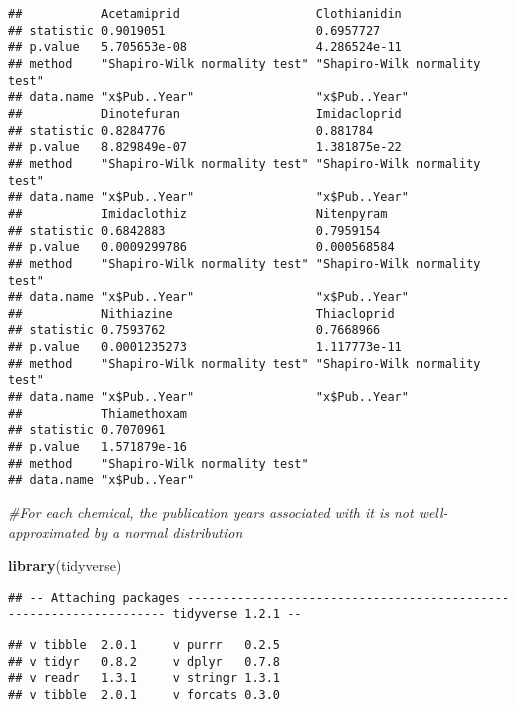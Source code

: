 \documentclass[]{article}
\newenvironment{Shaded}{\begin{snugshade}}{\end{snugshade}}
\newcommand{\KeywordTok}[1]{\textcolor[rgb]{0.13,0.29,0.53}{\textbf{#1}}}
\newcommand{\CommentTok}[1]{\textcolor[rgb]{0.56,0.35,0.01}{\textit{#1}}}
\newcommand{\NormalTok}[1]{#1}
\begin{document}
\begin{verbatim}
##           Acetamiprid                   Clothianidin                 
## statistic 0.9019051                     0.6957727                    
## p.value   5.705653e-08                  4.286524e-11                 
## method    "Shapiro-Wilk normality test" "Shapiro-Wilk normality test"
## data.name "x$Pub..Year"                 "x$Pub..Year"                
##           Dinotefuran                   Imidacloprid                 
## statistic 0.8284776                     0.881784                     
## p.value   8.829849e-07                  1.381875e-22                 
## method    "Shapiro-Wilk normality test" "Shapiro-Wilk normality test"
## data.name "x$Pub..Year"                 "x$Pub..Year"                
##           Imidaclothiz                  Nitenpyram                   
## statistic 0.6842883                     0.7959154                    
## p.value   0.0009299786                  0.000568584                  
## method    "Shapiro-Wilk normality test" "Shapiro-Wilk normality test"
## data.name "x$Pub..Year"                 "x$Pub..Year"                
##           Nithiazine                    Thiacloprid                  
## statistic 0.7593762                     0.7668966                    
## p.value   0.0001235273                  1.117773e-11                 
## method    "Shapiro-Wilk normality test" "Shapiro-Wilk normality test"
## data.name "x$Pub..Year"                 "x$Pub..Year"                
##           Thiamethoxam                 
## statistic 0.7070961                    
## p.value   1.571879e-16                 
## method    "Shapiro-Wilk normality test"
## data.name "x$Pub..Year"
\end{verbatim}

\begin{Shaded}
\begin{Highlighting}[]
\CommentTok{#For each chemical, the publication years associated with it is not well-approximated by a normal distribution}

\KeywordTok{library}\NormalTok{(tidyverse)}
\end{Highlighting}
\end{Shaded}

\begin{verbatim}
## -- Attaching packages ------------------------------------------------------------------- tidyverse 1.2.1 --
\end{verbatim}

\begin{verbatim}
## v tibble  2.0.1     v purrr   0.2.5
## v tidyr   0.8.2     v dplyr   0.7.8
## v readr   1.3.1     v stringr 1.3.1
## v tibble  2.0.1     v forcats 0.3.0
\end{verbatim}
\end{document}
